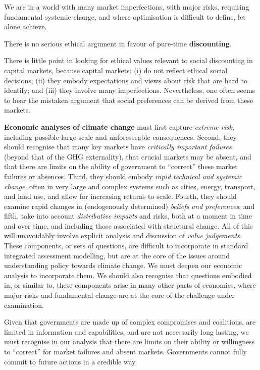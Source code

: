 \documentclass[
]{book}
\begin{document}
We are in a world with many market imperfections, with major risks, requiring
fundamental systemic change, and where optimisation is difficult to define, let alone achieve.

There is no serious ethical argument in favour of pure-time \textbf{discounting}.

There is little point in looking for ethical values relevant to
social discounting in capital markets, because capital markets: (i) do not reflect ethical social decisions;
(ii) they embody expectations and views about risk that are hard to identify; and (iii) they involve many
imperfections. Nevertheless, one often seems to hear the mistaken argument that social preferences
can be derived from these markets.

\textbf{Economic analyses of climate change} must first capture \emph{extreme risk}, including possible large-scale and unforeseeable consequences. Second, they should recognise that many key markets have
\emph{critically important failures} (beyond that of the GHG externality), that crucial markets may be absent,
and that there are limits on the ability of government to ``correct'' these market failures or absences.
Third, they should embody \emph{rapid technical and systemic change}, often in very large and complex
systems such as cities, energy, transport, and land use, and allow for increasing returns to scale.
Fourth, they should examine rapid changes in (endogenously determined) \emph{beliefs and preferences};
and fifth, take into account \emph{distributive impacts} and risks, both at a moment in time and over time, and
including those associated with structural change. All of this will unavoidably involve explicit analysis
and discussion of \emph{value judgements}. These components, or sets of questions, are difficult to
incorporate in standard integrated assessment modelling, but are at the core of the issues around
understanding policy towards climate change. We must deepen our economic analysis to incorporate
them. We should also recognise that questions embodied in, or similar to, these components arise in
many other parts of economics, where major risks and fundamental change are at the core of the
challenge under examination.

Given that governments are made up of complex compromises and coalitions, are limited in
information and capabilities, and are not necessarily long lasting, we must recognise in our analysis
that there are limits on their ability or willingness to ``correct'' for market failures and absent markets.
Governments cannot fully commit to future actions in a credible way.
\end{document}
